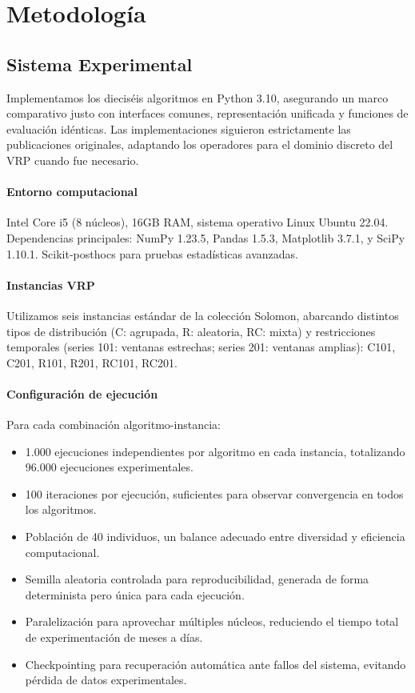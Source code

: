 \documentclass[conference,a4paper]{IEEEtran}
\begin{document}
\section{Metodología}\label{sec:metodologia}

\subsection{Sistema Experimental}

Implementamos los dieciséis algoritmos en Python 3.10, asegurando un marco comparativo justo con interfaces comunes, representación unificada y funciones de evaluación idénticas. Las implementaciones siguieron estrictamente las publicaciones originales, adaptando los operadores para el dominio discreto del VRP cuando fue necesario.

\paragraph{Entorno computacional} Intel Core i5 (8 núcleos), 16GB RAM, sistema operativo Linux Ubuntu 22.04. Dependencias principales: NumPy 1.23.5, Pandas 1.5.3, Matplotlib 3.7.1, y SciPy 1.10.1. Scikit-posthocs para pruebas estadísticas avanzadas.

\paragraph{Instancias VRP} Utilizamos seis instancias estándar de la colección Solomon, abarcando distintos tipos de distribución (C: agrupada, R: aleatoria, RC: mixta) y restricciones temporales (series 101: ventanas estrechas; series 201: ventanas amplias): C101, C201, R101, R201, RC101, RC201.

\paragraph{Configuración de ejecución} Para cada combinación algoritmo-instancia:
\begin{itemize}
\item 1.000 ejecuciones independientes por algoritmo en cada instancia, totalizando 96.000 ejecuciones experimentales.
\item 100 iteraciones por ejecución, suficientes para observar convergencia en todos los algoritmos.
\item Población de 40 individuos, un balance adecuado entre diversidad y eficiencia computacional.
\item Semilla aleatoria controlada para reproducibilidad, generada de forma determinista pero única para cada ejecución.
\item Paralelización para aprovechar múltiples núcleos, reduciendo el tiempo total de experimentación de meses a días.
\item Checkpointing para recuperación automática ante fallos del sistema, evitando pérdida de datos experimentales.
\end{itemize}
\end{document}
